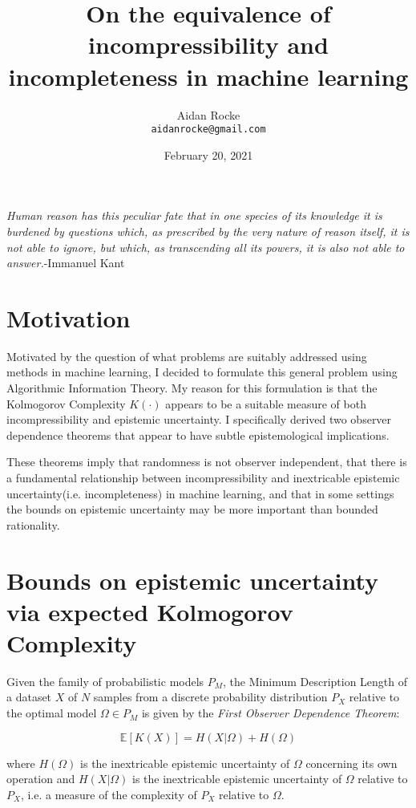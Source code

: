 \documentclass{article}
\title{On the equivalence of incompressibility and incompleteness in machine learning}
\date{February 20, 2021}
\author{%
  Aidan Rocke\\
  \texttt{aidanrocke@gmail.com} \\
}
\begin{document}
\maketitle

\textit{Human reason has this peculiar fate that in one species of its knowledge it is burdened by questions which, as prescribed by the very nature of reason itself, it is not able to ignore, but which, as transcending all its powers, it is also not able to answer.}-Immanuel Kant

\section{Motivation}

Motivated by the question of what problems are suitably addressed using methods in machine learning, I decided to formulate this general problem using Algorithmic Information Theory. My reason for this formulation is that the Kolmogorov Complexity $K(\cdot)$ appears to be a suitable measure of both incompressibility and epistemic uncertainty. I specifically derived two observer dependence theorems that appear to have subtle epistemological implications.

These theorems imply that randomness is not observer independent, that there is a fundamental relationship between incompressibility and inextricable epistemic uncertainty(i.e. incompleteness) in machine learning, and that in some settings the bounds on epistemic uncertainty may be more important than bounded rationality.

\section{Bounds on epistemic uncertainty via expected Kolmogorov Complexity}

Given the family of probabilistic models $P_M$, the Minimum Description Length of a dataset $X$ of $N$ samples
from a discrete probability distribution $P_X$ relative to the optimal model $\Omega \in P_M$ is given by the
\textit{First Observer Dependence Theorem}:

\begin{equation}
\mathbb{E}[K(X)] = H(X|\Omega) + H(\Omega) \tag{1}
\end{equation}

where $H(\Omega)$ is the inextricable epistemic uncertainty of $\Omega$ concerning its own operation and $H(X|\Omega)$
is the inextricable epistemic uncertainty of $\Omega$ relative to $P_X$, i.e. a measure of the complexity of $P_X$ relative to $\Omega$. 
\end{document}
